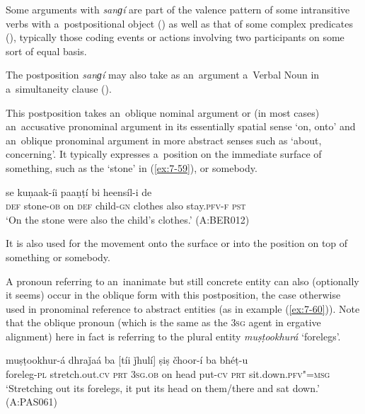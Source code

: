 Some arguments with \textit{sanɡí} are part of the valence pattern of some intransitive verbs with a~postpositional object () as well as that of some complex predicates (), typically those coding events or actions involving two participants on some sort of equal basis.


The postposition \textit{sanɡí} may also take as an~argument a~Verbal Noun in a~simultaneity clause ().


 This postposition takes an~oblique nominal argument or (in most cases) an~accusative pronominal argument in its essentially spatial sense `on, onto' and an~oblique pronominal argument in more abstract senses such as `about, concerning'. It typically expresses a~position on the immediate surface of something, such as the `stone' in (\ref{ex:7-59}), or somebody.

\begin{exe}
\ex
\label{ex:7-59}
 se kuṇaak-íi paaṇṭí bi heensíl-i de \\
\textsc{def} stone-\textsc{ob} on \textsc{def}  child-\textsc{gn}  clothes also  stay.\textsc{pfv-f} \textsc{pst } \\
\glt `On the stone were also the child's clothes.' (A:BER012)
\end{exe}

It is also used for the movement onto the surface or into the position on top of something or somebody.


A pronoun referring to an~inanimate but still concrete entity can also (optionally it seems) occur in the oblique form with this postposition, the case otherwise used in pronominal reference to abstract entities (as in example (\ref{ex:7-60})). Note that the oblique pronoun (which is the same as the \textsc{3sg} agent in ergative alignment) here in fact is referring to the plural entity \textit{muṣṭookhurá} `forelegs'.

\begin{exe}
\ex
\label{ex:7-60}
\gll muṣṭookhur-á dhraǰaá ba [tíi ǰhulí] ṣiṣ čhoor-í ba bhéṭ-u \\
foreleg-\textsc{pl} stretch.out.\textsc{cv} \textsc{prt} \textsc{3sg.ob} on head put-\textsc{cv} \textsc{prt} sit.down.\textsc{pfv"=msg} \\
\glt `Stretching out its forelegs, it put its head on them/there and sat down.' (A:PAS061)
\end{exe}

